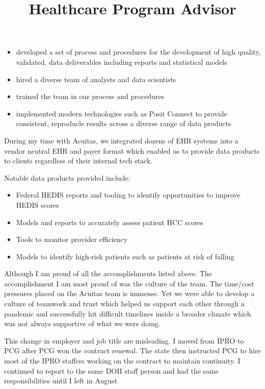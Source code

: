\documentclass[line, mm, 10pt]{res}
\begin{document}
\begin{resume}
\begin{position}
    \begin{itemize}
    \item developed a set of process and procedures for the development of high
    quality, validated, data deliverables including reports and statistical models
    \item hired a diverse team of analysts and data scientists
    \item trained the team in our process and procedures
    \item implemented modern technologies such as Posit Connect to provide
    consistent, reproducle results across a diverse range of data products
    \end{itemize}

    During my time with Acuitas, we integrated dozens of EHR systems into a
    vendor neutral EHR and payer format which enabled us to provide data
    products to clients regardless of their internal tech stack.
    
    Notable data products provided include:

    \begin{itemize}
      \item Federal HEDIS reports and tooling to identify opportunities to
      improve HEDIS scores
      \item Models and reports to accurately assess patient HCC scores
      \item Tools to monitor provider efficiency
      \item Models to identify high-risk patients such as patients at risk of
      falling
    \end{itemize}
  \end{position}

  Although I am proud of all the accomplishments listed above. The
  accomplishment I am most proud of was the culture of the team. The time/cost
  pressures placed on the Acuitas team is immense. Yet we were able to develop
  a culture of teamwork and trust which helped us support each other through a
  pandemic and successfully hit difficult timelines inside a broader climate
  which was not always supportive of what we were doing.

  \title{Healthcare Program Advisor}
  \begin{position}
    This change in employer and job title are misleading. I moved from IPRO to
    PCG after PCG won the contract renewal. The state then instructed PCG to
    hire most of the IPRO staffers working on the contract to maintain
    continuity. I continued to report to the same DOH staff person and had the
    same responsibilities until I left in August.
  \end{position}


\end{resume}
\end{document}
